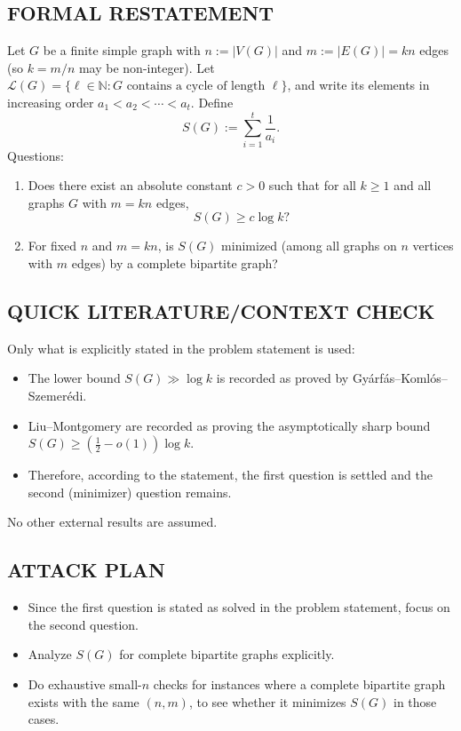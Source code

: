 \subsection*{FORMAL RESTATEMENT}
Let $G$ be a finite simple graph with $n:=|V(G)|$ and $m:=|E(G)|=kn$ edges (so $k=m/n$ may be non-integer).
Let $\mathcal{L}(G)=\{\ell\in\mathbb{N}: G \text{ contains a cycle of length }\ell\}$, and write its elements in increasing 
order $a_1<a_2<\cdots<a_t$.
Define
\[
S(G):=\sum_{i=1}^t \frac{1}{a_i}.
\]
Questions:
\begin{enumerate}
\item Does there exist an absolute constant $c>0$ such that for all $k\ge1$ and all graphs $G$ with $m=kn$ edges,
\[ S(G)\ge c\log k?\]
\item For fixed $n$ and $m=kn$, is $S(G)$ minimized (among all graphs on $n$ vertices with $m$ edges) by a complete 
bipartite graph?
\end{enumerate}

\subsection*{QUICK LITERATURE/CONTEXT CHECK}
Only what is explicitly stated in the problem statement is used:
\begin{itemize}
\item The lower bound $S(G)\gg\log k$ is recorded as proved by Gy\'{a}rf\'{a}s--Koml\'{o}s--Szemer\'{e}di.
\item Liu--Montgomery are recorded as proving the asymptotically sharp bound $S(G)\ge (\tfrac12-o(1))\log k$.
\item Therefore, according to the statement, the first question is settled and the second (minimizer) question remains.
\end{itemize}
No other external results are assumed.

\subsection*{ATTACK PLAN}
\begin{itemize}
\item Since the first question is stated as solved in the problem statement, focus on the second question.
\item Analyze $S(G)$ for complete bipartite graphs explicitly.
\item Do exhaustive small-$n$ checks for instances where a complete bipartite graph exists with the same $(n,m)$, to see 
whether it minimizes $S(G)$ in those cases.
\end{itemize}

